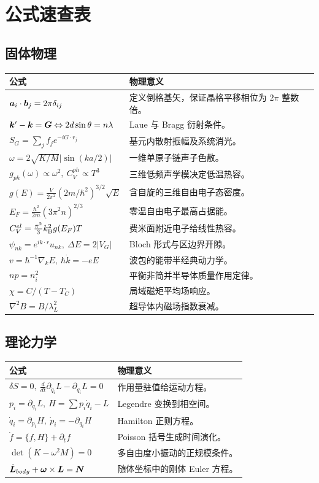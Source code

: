 \chapter{公式速查表}
\small
\section{固体物理}
\begin{longtable}{p{}p{}}\toprule
公式&物理意义\\\midrule\endhead
$\bm{a}_i\cdot\bm{b}_j=2\pi\delta_{ij}$&定义倒格基矢，保证晶格平移相位为 $2\pi$ 整数倍。\\
$\bm{k}'-\bm{k}=\bm{G}\Leftrightarrow2d\sin\theta=n\lambda$&Laue 与 Bragg 衍射条件。\\
$S_G=\sum_jf_j e^{-iG\cdot r_j}$&基元内散射振幅及系统消光。\\
$\omega=2\sqrt{K/M}|\sin(ka/2)|$&一维单原子链声子色散。\\
$g_{ph}(\omega)\propto\omega^2,\ C_V^{ph}\propto T^3$&三维低频声学模决定低温热容。\\
$g(E)=\frac{V}{2\pi^2}(2m/\hbar^2)^{3/2}\sqrt E$&含自旋的三维自由电子态密度。\\
$E_F=\frac{\hbar^2}{2m}(3\pi^2n)^{2/3}$&零温自由电子最高占据能。\\
$C_V^{el}=\frac{\pi^2}{3}k_{\mathrm B}^2g(E_F)T$&费米面附近电子给线性热容。\\
$\psi_{nk}=e^{ik\cdot r}u_{nk},\ \Delta E=2|V_G|$&Bloch 形式与区边界开隙。\\
$v=\hbar^{-1}\nabla_kE,\ \hbar\dot k=-eE$&波包的能带半经典动力学。\\
$np=n_i^2$&平衡非简并半导体质量作用定律。\\
$\chi=C/(T-T_C)$&局域磁矩平均场响应。\\
$\nabla^2B=B/\lambda_L^2$&超导体内磁场指数衰减。\\\bottomrule
\end{longtable}

\section{理论力学}
\begin{longtable}{p{}p{}}\toprule
公式&物理意义\\\midrule\endhead
$\delta S=0,\ \frac d{dt}\partial_{\dot q_i}L-\partial_{q_i}L=0$&作用量驻值给运动方程。\\
$p_i=\partial_{\dot q_i}L,\ H=\sum p_i\dot q_i-L$&Legendre 变换到相空间。\\
$\dot q_i=\partial_{p_i}H,\ \dot p_i=-\partial_{q_i}H$&Hamilton 正则方程。\\
$\dot f=\{f,H\}+\partial_tf$&Poisson 括号生成时间演化。\\
$\det(K-\omega^2M)=0$&多自由度小振动的正规模条件。\\
$\dot{\bm{L}}_{body}+\bm{\omega}\times\bm{L}=\bm{N}$&随体坐标中的刚体 Euler 方程。\\\bottomrule
\end{longtable}

